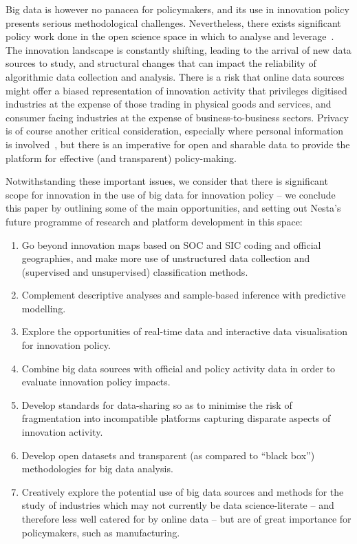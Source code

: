 \documentclass[a4paper,11pt]{article}
\begin{document}
Big data is however no panacea for policymakers, and its use in
innovation policy presents serious methodological
challenges. Nevertheless, there exists significant policy work done in
the open science space in which to analyse and
leverage~\citep{rssaaoe:2012}. The innovation landscape is constantly
shifting, leading to the arrival of new data sources to study, and
structural changes that can impact the reliability of algorithmic data
collection and analysis. There is a risk that online data sources
might offer a biased representation of innovation activity that
privileges digitised industries at the expense of those trading in
physical goods and services, and consumer facing industries at the
expense of business-to-business sectors. Privacy is of course another
critical consideration, especially where personal information is
involved~\citep{hocstc:2014}, but there is an imperative for open and
sharable data to provide the platform for effective (and transparent)
policy-making.

Notwithstanding these important issues, we consider that there is
significant scope for innovation in the use of big data for innovation
policy -- we conclude this paper by outlining some of the main
opportunities, and setting out Nesta's future programme of research
and platform development in this space:

\begin{enumerate}
\item Go beyond innovation maps based on SOC and SIC coding and
  official geographies, and make more use of unstructured data
  collection and (supervised and unsupervised) classification methods.
\item Complement descriptive analyses and sample-based
  inference with predictive modelling.
\item Explore the opportunities of real-time data and interactive
  data visualisation for innovation policy.
\item Combine big data sources with official and policy activity
  data in order to evaluate innovation policy impacts.
\item Develop standards for data-sharing so as to minimise the risk
  of fragmentation into incompatible platforms capturing disparate
  aspects of innovation activity.
\item Develop open datasets and transparent (as compared to ``black
  box'') methodologies for big data analysis.
\item Creatively explore the potential use of big data sources and
methods for the study of industries which may not currently be data
science-literate -- and therefore less well catered for by online data
-- but are of great importance for policymakers, such as
manufacturing.
\end{enumerate}




\end{document}
